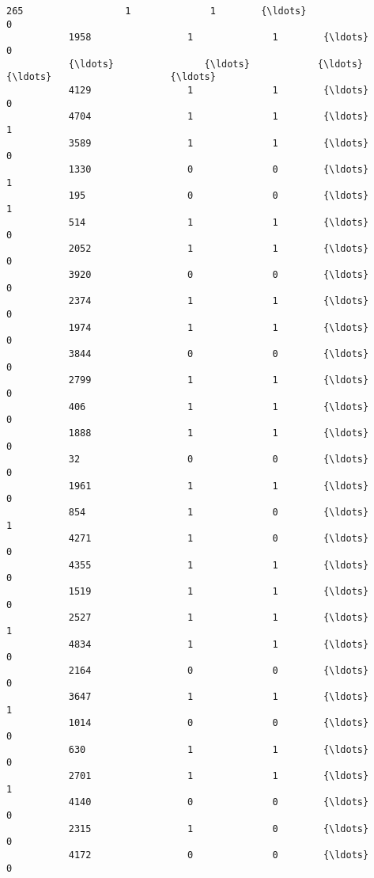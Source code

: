 \documentclass[11pt]{article}
\begin{document}
\begin{Verbatim}[commandchars=\\\{\}]
           265                  1              1        {\ldots}                       0   
           1958                 1              1        {\ldots}                       0   
           {\ldots}                {\ldots}            {\ldots}        {\ldots}                     {\ldots}   
           4129                 1              1        {\ldots}                       0   
           4704                 1              1        {\ldots}                       1   
           3589                 1              1        {\ldots}                       0   
           1330                 0              0        {\ldots}                       1   
           195                  0              0        {\ldots}                       1   
           514                  1              1        {\ldots}                       0   
           2052                 1              1        {\ldots}                       0   
           3920                 0              0        {\ldots}                       0   
           2374                 1              1        {\ldots}                       0   
           1974                 1              1        {\ldots}                       0   
           3844                 0              0        {\ldots}                       0   
           2799                 1              1        {\ldots}                       0   
           406                  1              1        {\ldots}                       0   
           1888                 1              1        {\ldots}                       0   
           32                   0              0        {\ldots}                       0   
           1961                 1              1        {\ldots}                       0   
           854                  1              0        {\ldots}                       1   
           4271                 1              0        {\ldots}                       0   
           4355                 1              1        {\ldots}                       0   
           1519                 1              1        {\ldots}                       0   
           2527                 1              1        {\ldots}                       1   
           4834                 1              1        {\ldots}                       0   
           2164                 0              0        {\ldots}                       0   
           3647                 1              1        {\ldots}                       1   
           1014                 0              0        {\ldots}                       0   
           630                  1              1        {\ldots}                       0   
           2701                 1              1        {\ldots}                       1   
           4140                 0              0        {\ldots}                       0   
           2315                 1              0        {\ldots}                       0   
           4172                 0              0        {\ldots}                       0   
           

\end{Verbatim}
\end{document}
